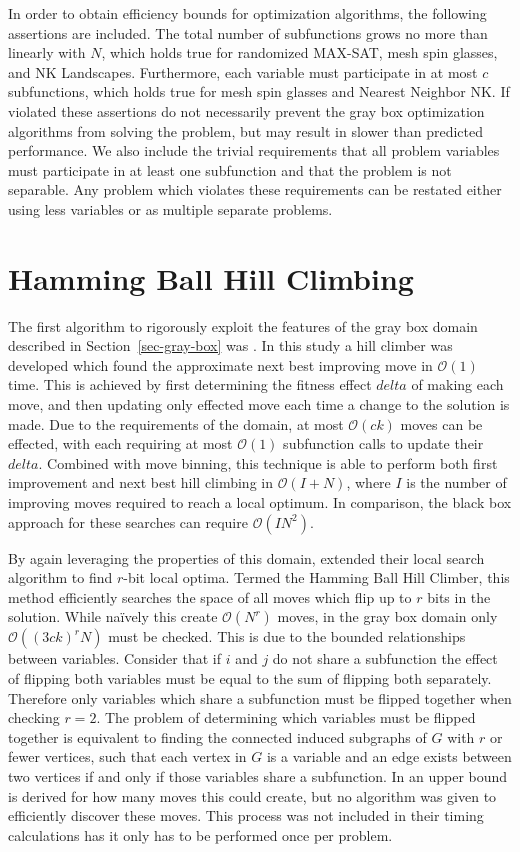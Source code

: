 \documentclass{sig-alternate}
\newcommand{\BigO}[1]{$\mathcal{O}{(#1)}$}
\begin{document}
In order to obtain efficiency bounds for optimization algorithms, the following
assertions are included. The total number of subfunctions grows no more than
linearly with $N$, which holds true for randomized MAX-SAT, mesh spin glasses, and NK Landscapes.
Furthermore, each variable must participate in at most $c$ subfunctions, which holds true
for mesh spin glasses and Nearest Neighbor NK. If violated these assertions do not
necessarily prevent the gray box optimization algorithms from solving the problem, but may result
in slower than predicted performance.
We also include the trivial requirements that all problem variables must participate
in at least one subfunction and that the problem is not separable. Any problem which
violates these requirements can be restated either using less variables or as multiple separate problems.

\section{Hamming Ball Hill Climbing}
The first algorithm to rigorously exploit the features of the gray box domain
described in Section~\ref{sec-gray-box} was \cite{whitley:2013:greedy}. In this study
a hill climber was developed which found the approximate next best improving move in \BigO{1} time.
This is achieved by first determining the fitness effect $delta$ of making each move, and then updating
only effected move each time a change to the solution is made. Due to the requirements of the domain,
at most \BigO{ck} moves can be effected, with each requiring at most \BigO{1} subfunction calls
to update their $delta$. Combined with move binning, this technique is able to perform both
first improvement and next best hill climbing in \BigO{I+N}, where $I$ is the number of improving
moves required to reach a local optimum. In comparison, the black box approach for these searches can require
\BigO{IN^2}.

By again leveraging the properties of this domain, \cite{chicano:2014:ball} extended their
local search algorithm to find $r$-bit local optima. Termed the Hamming Ball Hill Climber,
this method efficiently searches the space of all moves which flip up to $r$ bits in the
solution. While na\"ively this create \BigO{N^r} moves, in the gray box domain only
\BigO{(3ck)^rN} must be checked. This is due to the bounded relationships between variables.
Consider that if $i$ and $j$ do not share a subfunction the effect of flipping both variables
must be equal to the sum of flipping both separately. Therefore only variables which share
a subfunction must be flipped together when checking $r=2$. The problem of determining
which variables must be flipped together is equivalent to finding the connected induced
subgraphs of $G$ with $r$ or fewer vertices, such that each vertex in $G$ is a variable
and an edge exists between two vertices if and only if those variables share a subfunction.
In \cite{chicano:2014:ball} an upper bound is derived for how many moves this could create,
but no algorithm was given to efficiently discover these moves. This process was not included
in their timing calculations has it only has to be performed once per problem.
\end{document}
